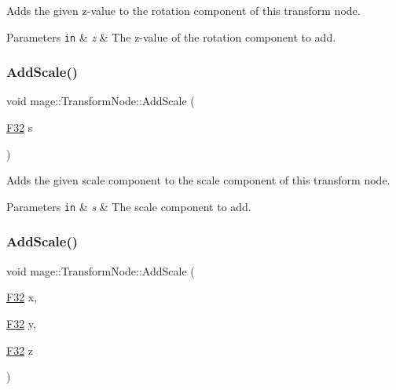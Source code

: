 Adds the given z-\/value to the rotation component of this transform node.


\begin{DoxyParams}[1]{Parameters}
\mbox{\tt in}  & {\em z} & The z-\/value of the rotation component to add. \\
\hline
\end{DoxyParams}
\hypertarget{structmage_1_1_transform_node_ac45f837c9dc6e8cd143a72337b69893e}{}\label{structmage_1_1_transform_node_ac45f837c9dc6e8cd143a72337b69893e} 
\subsubsection{\texorpdfstring{Add\+Scale()}{AddScale()}\hspace{0.1cm}{\footnotesize\ttfamily [1/4]}}
{\footnotesize\ttfamily void mage\+::\+Transform\+Node\+::\+Add\+Scale (\begin{DoxyParamCaption}\item[{\hyperlink{namespacemage_aa97e833b45f06d60a0a9c4fc22ae02c0}{F32}}]{s }\end{DoxyParamCaption})\hspace{0.3cm}{\ttfamily [noexcept]}}

Adds the given scale component to the scale component of this transform node.


\begin{DoxyParams}[1]{Parameters}
\mbox{\tt in}  & {\em s} & The scale component to add. \\
\hline
\end{DoxyParams}
\hypertarget{structmage_1_1_transform_node_af50ac0e9e6d7f6d610e9e399ebf05716}{}\label{structmage_1_1_transform_node_af50ac0e9e6d7f6d610e9e399ebf05716} 
\subsubsection{\texorpdfstring{Add\+Scale()}{AddScale()}\hspace{0.1cm}{\footnotesize\ttfamily [2/4]}}
{\footnotesize\ttfamily void mage\+::\+Transform\+Node\+::\+Add\+Scale (\begin{DoxyParamCaption}\item[{\hyperlink{namespacemage_aa97e833b45f06d60a0a9c4fc22ae02c0}{F32}}]{x,  }\item[{\hyperlink{namespacemage_aa97e833b45f06d60a0a9c4fc22ae02c0}{F32}}]{y,  }\item[{\hyperlink{namespacemage_aa97e833b45f06d60a0a9c4fc22ae02c0}{F32}}]{z }\end{DoxyParamCaption})\hspace{0.3cm}{\ttfamily [noexcept]}}


